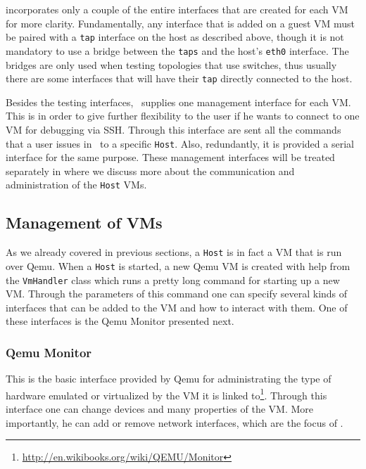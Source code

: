  incorporates only a couple of the entire interfaces that are created for each VM for more clarity.
Fundamentally, any interface that is added on a guest VM must be paired with a \texttt{tap} interface on the host as described above, though it is not mandatory to use a bridge between the \texttt{taps} and the host's \texttt{eth0} interface.
The bridges are only used when testing topologies that use switches, thus usually there are some interfaces that will have their \texttt{tap} directly connected to the host.

Besides the testing interfaces, \project\ supplies one management interface for each VM.
This is in order to give further flexibility to the user if he wants to connect to one VM for debugging via SSH.
Through this interface are sent all the commands that a user issues in \project\ to a specific \texttt{Host}.
Also, redundantly, it is provided a serial interface for the same purpose.
These management interfaces will be treated separately in  where we discuss more about the communication and administration of the \texttt{Host} VMs.

\subsection{Management of VMs}
\label{sub-sec:communication-with-vm}

As we already covered in previous sections, a \texttt{Host} is in fact a VM that is run over Qemu.
When a \texttt{Host} is started, a new Qemu VM is created with help from the \texttt{VmHandler} class which runs a pretty long command for starting up a new VM.
Through the parameters of this command one can specify several kinds of interfaces that can be added to the VM and how to interact with them.
One of these interfaces is the Qemu Monitor presented next.

\subsubsection{Qemu Monitor}
\label{sub-sub-sec:qemu-monitor}

This is the basic interface provided by Qemu for administrating the type of hardware emulated or virtualized by the VM it is linked to\footnote{\url{http://en.wikibooks.org/wiki/QEMU/Monitor}}.
Through this interface one can change devices and many properties of the VM.
More importantly, he can add or remove network interfaces, which are the focus of \project.

